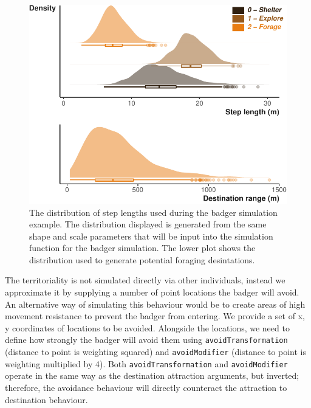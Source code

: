 \documentclass[10pt,a4paper]{article}
\begin{document}
\begin{figure}

{\centering \includegraphics{Agent-based_model_walkthrough_files/figure-latex/BADGERsettingMoveDesPlot-1} 

}

\caption{The distribution of step lengths used during the badger simulation example. The distribution displayed is generated from the same shape and scale parameters that will be input into the simulation function for the badger simulation. The lower plot shows the distribution used to generate potential foraging desintations.}\label{fig:BADGERsettingMoveDesPlot}
\end{figure}

The territoriality is not simulated directly via other individuals, instead we approximate it by supplying a number of point locations the badger will avoid.
An alternative way of simulating this behaviour would be to create areas of high movement resistance to prevent the badger from entering.
We provide a set of x, y coordinates of locations to be avoided.
Alongside the locations, we need to define how strongly the badger will avoid them using \texttt{avoidTransformation} (distance to point is weighting squared) and \texttt{avoidModifier} (distance to point is weighting multiplied by 4).
Both \texttt{avoidTransformation} and \texttt{avoidModifier} operate in the same way as the destination attraction arguments, but inverted; therefore, the avoidance behaviour will directly counteract the attraction to destination behaviour.
\end{document}
